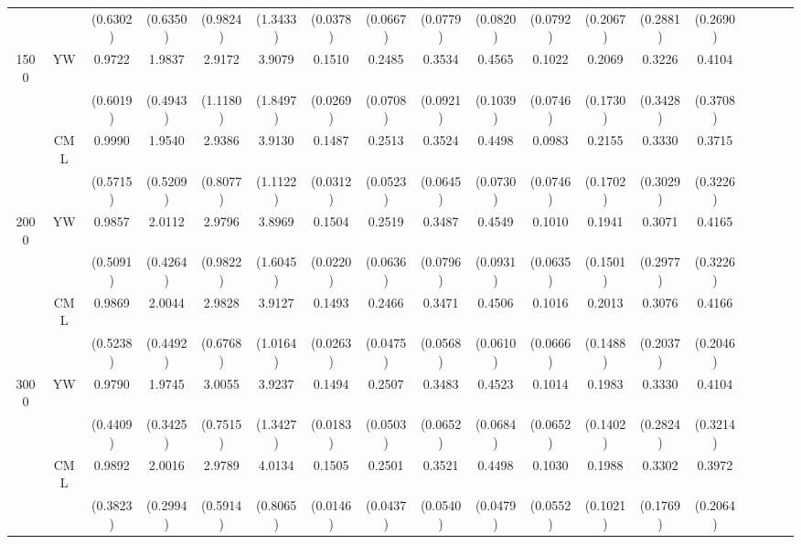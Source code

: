 \documentclass{article}
\begin{document}
\begin{table}[ht]
\begin{adjustbox}{width=\textwidth}
\begin{tabularx}{\textwidth}{cccccccccccccccccc}
 & & (0.6302) & (0.6350) & (0.9824) & (1.3433) & (0.0378) & (0.0667) & (0.0779) & (0.0820) & (0.0792) & (0.2067) & (0.2881) & (0.2690) \\ 
\cline{1-14}
1500 & YW & 0.9722 & 1.9837 & 2.9172 & 3.9079 & 0.1510 & 0.2485 & 0.3534 & 0.4565 & 0.1022 & 0.2069 & 0.3226 & 0.4104 \\ 
 & & (0.6019) & (0.4943) & (1.1180) & (1.8497) & (0.0269) & (0.0708) & (0.0921) & (0.1039) & (0.0746) & (0.1730) & (0.3428) & (0.3708) \\ 
 & CML & 0.9990 & 1.9540 & 2.9386 & 3.9130 & 0.1487 & 0.2513 & 0.3524 & 0.4498 & 0.0983 & 0.2155 & 0.3330 & 0.3715 \\ 
 & & (0.5715) & (0.5209) & (0.8077) & (1.1122) & (0.0312) & (0.0523) & (0.0645) & (0.0730) & (0.0746) & (0.1702) & (0.3029) & (0.3226) \\ 
\cline{1-14}
2000 & YW & 0.9857 & 2.0112 & 2.9796 & 3.8969 & 0.1504 & 0.2519 & 0.3487 & 0.4549 & 0.1010 & 0.1941 & 0.3071 & 0.4165 \\ 
 & & (0.5091) & (0.4264) & (0.9822) & (1.6045) & (0.0220) & (0.0636) & (0.0796) & (0.0931) & (0.0635) & (0.1501) & (0.2977) & (0.3226) \\ 
 & CML & 0.9869 & 2.0044 & 2.9828 & 3.9127 & 0.1493 & 0.2466 & 0.3471 & 0.4506 & 0.1016 & 0.2013 & 0.3076 & 0.4166 \\ 
 & & (0.5238) & (0.4492) & (0.6768) & (1.0164) & (0.0263) & (0.0475) & (0.0568) & (0.0610) & (0.0666) & (0.1488) & (0.2037) & (0.2046) \\ 
\cline{1-14}
3000 & YW & 0.9790 & 1.9745 & 3.0055 & 3.9237 & 0.1494 & 0.2507 & 0.3483 & 0.4523 & 0.1014 & 0.1983 & 0.3330 & 0.4104 \\ 
 & & (0.4409) & (0.3425) & (0.7515) & (1.3427) & (0.0183) & (0.0503) & (0.0652) & (0.0684) & (0.0652) & (0.1402) & (0.2824) & (0.3214) \\ 
 & CML & 0.9892 & 2.0016 & 2.9789 & 4.0134 & 0.1505 & 0.2501 & 0.3521 & 0.4498 & 0.1030 & 0.1988 & 0.3302 & 0.3972 \\ 
 & & (0.3823) & (0.2994) & (0.5914) & (0.8065) & (0.0146) & (0.0437) & (0.0540) & (0.0479) & (0.0552) & (0.1021) & (0.1769) & (0.2064) \\ 
\bottomrule
\end{tabularx}
\end{adjustbox}
\end{table}
\end{document}
